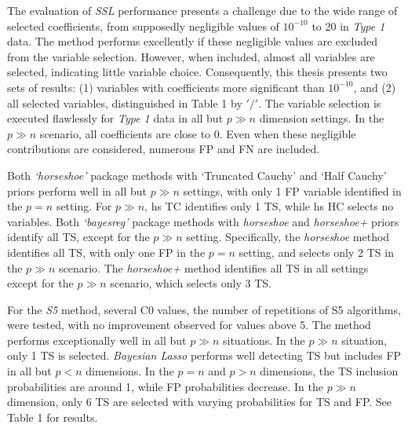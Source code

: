 \documentclass[
  11pt,
]{article}
\begin{document}
The evaluation of \emph{SSL} performance presents a challenge due to the
wide range of selected coefficients, from supposedly negligible values
of \(10^{-10}\) to 20 in \emph{Type 1} data. The method performs
excellently if these negligible values are excluded from the variable
selection. However, when included, almost all variables are selected,
indicating little variable choice. Consequently, this thesis presents
two sets of results: (1) variables with coefficients more significant
than \(10^{-10}\), and (2) all selected variables, distinguished in
Table 1 by \('/'\). The variable selection is executed flawlessly for
\emph{Type 1} data in all but \(p \gg n\) dimension settings. In the
\(p \gg n\) scenario, all coefficients are close to 0. Even when these
negligible contributions are considered, numerous FP and FN are
included.

Both \emph{`horseshoe'} package methods with `Truncated Cauchy' and
`Half Cauchy' priors perform well in all but \(p \gg n\) settings, with
only 1 FP variable identified in the \(p=n\) setting. For \(p \gg n\),
hs TC identifies only 1 TS, while hs HC selects no variables. Both
\emph{`bayesreg'} package methods with \emph{horseshoe} and
\emph{horseshoe+} priors identify all TS, except for the \(p \gg n\)
setting. Specifically, the \emph{horseshoe} method identifies all TS,
with only one FP in the \(p=n\) setting, and selects only 2 TS in the
\(p \gg n\) scenario. The \emph{horseshoe+} method identifies all TS in
all settings except for the \(p \gg n\) scenario, which selects only 3
TS.

For the \emph{S5} method, several C0 values, the number of repetitions
of S5 algorithms, were tested, with no improvement observed for values
above 5. The method performs exceptionally well in all but \(p \gg n\)
situations. In the \(p \gg n\) situation, only 1 TS is selected.
\emph{Bayesian Lasso} performs well detecting TS but includes FP in all
but \(p<n\) dimensions. In the \(p=n\) and \(p>n\) dimensions, the TS
inclusion probabilities are around 1, while FP probabilities decrease.
In the \(p \gg n\) dimension, only 6 TS are selected with varying
probabilities for TS and FP. See Table 1 for results.
\end{document}

